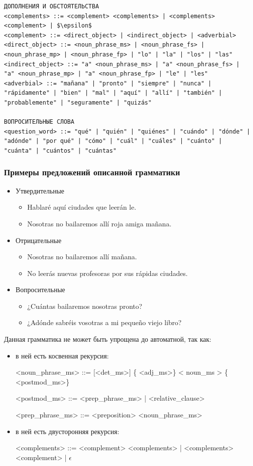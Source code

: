 \documentclass[a4paper,final]{article}
\begin{document}
{\begin{lstlisting}[caption = {Грамматика подмножества языка в БНФ}]
ДОПОЛНЕНИЯ И ОБСТОЯТЕЛЬСТВА
<complements> ::= <complement> <complements> | <complements> <complement> | $\epsilon$
<complement> ::= <direct_object> | <indirect_object> | <adverbial>
<direct_object> ::= <noun_phrase_ms> | <noun_phrase_fs> | <noun_phrase_mp> | <noun_phrase_fp> | "lo" | "la" | "los" | "las"
<indirect_object> ::= "a" <noun_phrase_ms> | "a" <noun_phrase_fs> | "a" <noun_phrase_mp> | "a" <noun_phrase_fp> | "le" | "les"
<adverbial> ::= "mañana" | "pronto" | "siempre" | "nunca" | "rápidamente" | "bien" | "mal" | "aquí" | "allí" | "también" | "probablemente" | "seguramente" | "quizás"

ВОПРОСИТЕЛЬНЫЕ СЛОВА
<question_word> ::= "qué" | "quién" | "quiénes" | "cuándo" | "dónde" | "adónde" | "por qué" | "cómo" | "cuál" | "cuáles" | "cuánto" | "cuánta" | "cuántos" | "cuántas"
\end{lstlisting}
}
\small

\subsubsection{Примеры предложений описанной грамматики}
\begin{itemize}
    \item Утвердительные
    \begin{itemize}
        \item Hablaré aquí ciudades que leerán le.
        \item Nosotras no bailaremos allí roja amiga mañana.
    \end{itemize}
    \item Отрицательные
    \begin{itemize}
        \item Nosotras no bailaremos allí mañana.
        \item No leerás nuevas profesoras por sus rápidas ciudades.
    \end{itemize}
    \item Вопросительные
    \begin{itemize}
        \item ¿Cuántas bailaremos nosotras pronto?
        \item ¿Adónde sabréis vosotras a mi pequeño viejo libro?
    \end{itemize}
\end{itemize}

Данная грамматика не может быть упрощена до автоматной, так как:
\begin{itemize}
    \item в ней есть косвенная рекурсия:

    <noun\_phrase\_ms> ::= [<det\_ms>] \{ <adj\_ms>\} < noun\_ms > \{ <postmod\_ms>\}
    
    <postmod\_ms> ::= <prep\_phrase\_ms> | <relative\_clause>
    
    <prep\_phrase\_ms> ::= <preposition> <noun\_phrase\_ms>

    \item в ней есть двусторонняя рекурсия:

    <complements> ::= <complement> <complements> | <complements> <complement> | $\epsilon$
\end{itemize}
\end{document}
